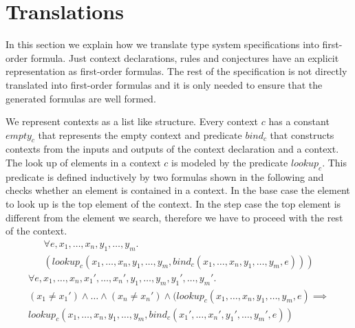 \section{Translations}
\label{sec:translations}
In this section we explain how we translate type system specifications
into first-order formula. Just context declarations, rules and
conjectures have an explicit representation as first-order
formulas. The rest of the specification is not directly translated
into first-order formulas and it is only needed to ensure that the
generated formulas are well formed.

We represent contexts as a list like structure. Every context $c$ has
a constant $empty_c$ that represents the empty context and predicate
$bind_c$ that constructs contexts from the inputs and outputs of the
context declaration and a context. The look up of elements in a
context $c$ is modeled by the predicate $lookup_c$. This predicate is
defined inductively by two formulas shown in the following and checks
whether an element is contained in a context. In the base case the
element to look up is the top element of the context. In the step case
the top element is different from the element we search, therefore we
have to proceed with the rest of the context.
\begin{multline}
  \forall e, x_1, \dots, x_n, y_1, \dots, y_m . \\
  (lookup_c(x_1,\dots,x_n,y_1,\dots,y_m,
  bind_c(x_1,\dots,x_n,y_1,\dots,y_m,e)))
\label{formula:context-base}
\end{multline}
\begin{multline}
  \forall e, x_1, \dots, x_n, x_1', \dots, x_n', y_1, \dots, y_m,
  y_1', \dots,
  y_m' . \\
  (x_1 \neq x_1') \land \dots \land (x_n \neq x_n') \land (lookup_c(x_1,
  \dots, x_n, y_1, \dots, y_m, e) \implies \\ lookup_c(x_1, \dots, x_n,
  y_1, \dots, y_m, bind_c(x_1',\dots,x_n',y_1',\dots,y_m',e))
\label{formula:context-step}
\end{multline}

